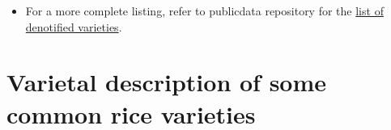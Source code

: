 \documentclass[
  openany]{book}
\providecommand{\tightlist}{%
  \setlength{\itemsep}{0pt}\setlength{\parskip}{0pt}}
\begin{document}
\begin{itemize}
\tightlist
\item
  For a more complete listing, refer to publicdata repository for the \href{https://raw.githubusercontent.com/DeependraD/publicdata/master/crop_varieties/denotified_varieties.csv}{list of denotified varieties}.
\end{itemize}

\hypertarget{varietal-description-of-some-common-rice-varieties}{%
\section{Varietal description of some common rice varieties}\label{varietal-description-of-some-common-rice-varieties}}

\begin{landscape}\begin{table}


\end{table}
\end{landscape}
\end{document}
